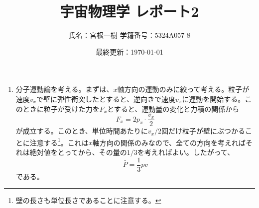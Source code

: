 \documentclass[unicode,a4paper,10pt]{ltjsarticle}
\begin{document}
\title{
  宇宙物理学
  \quad
  レポート2
}
\author{
  氏名：宮根一樹
  \quad
  学籍番号：5324A057-8
}
\date{最終更新：\today}

\maketitle

\begin{enumerate}
  \item 
  分子運動論を考える。まずは、$x$軸方向の運動のみに絞って考える。粒子が速度$v_{x}$で壁に弾性衝突したとすると、逆向きで速度$v_{x}$に運動を開始する。このときに粒子が受けた力を$F_{x}$とすると、運動量の変化と力積の関係から
  \begin{equation}
    F_{x}
    =
    2p_{x}\cdot\frac{v_{x}}{2}
  \end{equation}
  が成立する。このとき、単位時間あたりに$v_{x}/2$回だけ粒子が壁にぶつかることに注意する\footnote{
    壁の長さも単位長さであることに注意する。
  }。これは$x$軸方向の関係のみなので、全ての方向を考えればそれは絶対値をとってから、その量の$1/3$を考えればよい。したがって、
  \begin{equation}
    \bar{P}
    =
    \frac{1}{3}pv
  \end{equation}
  である。


\end{enumerate}
\end{document}
